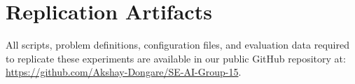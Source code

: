 \documentclass[sigconf,nonacm]{acmart}
\begin{document}
\section{Replication Artifacts}

All scripts, problem definitions, configuration files, and evaluation data required to replicate these experiments are available in our public GitHub repository at: \url{https://github.com/Akshay-Dongare/SE-AI-Group-15}.



\end{document}
